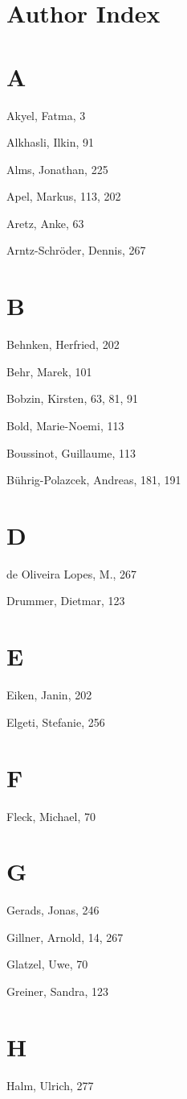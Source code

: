 \documentclass[10pt]{article}
\begin{document}
\section*{Author Index}
\section*{A}
Akyel, Fatma, 3

Alkhasli, Ilkin, 91

Alms, Jonathan, 225

Apel, Markus, 113, 202

Aretz, Anke, 63

Arntz-Schröder, Dennis, 267

\section*{B}
Behnken, Herfried, 202

Behr, Marek, 101

Bobzin, Kirsten, 63, 81, 91

Bold, Marie-Noemi, 113

Boussinot, Guillaume, 113

Bührig-Polazcek, Andreas, 181, 191

\section*{D}
de Oliveira Lopes, M., 267

Drummer, Dietmar, 123

\section*{E}
Eiken, Janin, 202

Elgeti, Stefanie, 256

\section*{F}
Fleck, Michael, 70

\section*{G}
Gerads, Jonas, 246

Gillner, Arnold, 14, 267

Glatzel, Uwe, 70

Greiner, Sandra, 123

\section*{H}
Halm, Ulrich, 277
\end{document}
